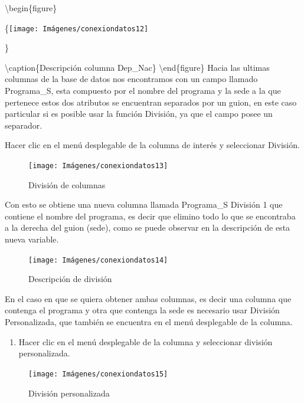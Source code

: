 \documentclass[
]{book}
\providecommand{\tightlist}{%
  \setlength{\itemsep}{0pt}\setlength{\parskip}{0pt}}
\begin{document}
\textbackslash begin\{figure\}

\{\centering \texttt{[image: Imágenes/conexiondatos12]}

\}

\textbackslash caption\{Descripción columna Dep\_Nac\}\label{fig:descripcion-fig}
\textbackslash end\{figure\}
Hacia las ultimas columnas de la base de datos nos encontramos con un campo llamado Programa\_S, esta compuesto por el nombre del programa y la sede a la que pertenece estos dos atributos se encuentran separados por un guion, en este caso particular si es posible usar la función División, ya que el campo posee un separador.

Hacer clic en el menú desplegable de la columna de interés y seleccionar División.

\begin{figure}

{\centering \texttt{[image: Imágenes/conexiondatos13]} 

}

\caption{División de columnas}\label{fig:división-fig}
\end{figure}

Con esto se obtiene una nueva columna llamada Programa\_S División 1 que contiene el nombre del programa, es decir que elimino todo lo que se encontraba a la derecha del guion (sede), como se puede observar en la descripción de esta nueva variable.

\begin{figure}

{\centering \texttt{[image: Imágenes/conexiondatos14]} 

}

\caption{Descripción de división}\label{fig:divisióndescripcion-fig}
\end{figure}

En el caso en que se quiera obtener ambas columnas, es decir una columna que contenga el programa y otra que contenga la sede es necesario usar División Personalizada, que también se encuentra en el menú desplegable de la columna.

\begin{enumerate}
\def\labelenumi{\arabic{enumi}.}
\tightlist
\item
  Hacer clic en el menú desplegable de la columna y seleccionar división personalizada.
\end{enumerate}

\begin{figure}

{\centering \texttt{[image: Imágenes/conexiondatos15]} 

}

\caption{División personalizada}\label{fig:divisiónpersonalizada-fig}
\end{figure}
\end{document}

